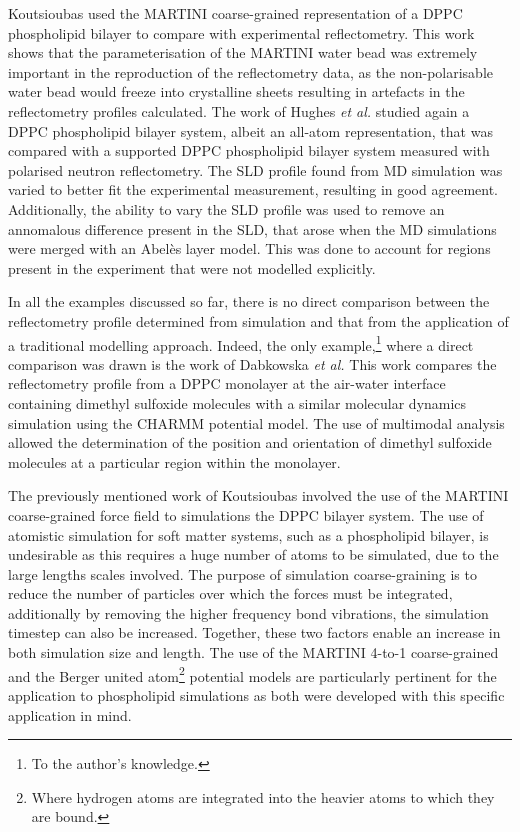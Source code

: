 Koutsioubas used the MARTINI coarse-grained representation of a DPPC phospholipid bilayer to compare with experimental reflectometry.\autocite{koutsioubas_combined_2016}
This work shows that the parameterisation of the MARTINI water bead was extremely important in the reproduction of the reflectometry data, as the non-polarisable water bead would freeze into crystalline sheets resulting in artefacts in the reflectometry profiles calculated.
The work of Hughes \emph{et al.} studied again a DPPC phospholipid bilayer system,\autocite{hughes_interpretation_2016} albeit an all-atom representation, that was compared with a supported DPPC phospholipid bilayer system measured with polarised neutron reflectometry.
The SLD profile found from MD simulation was varied to better fit the experimental measurement, resulting in good agreement.
Additionally, the ability to vary the SLD profile was used to remove an annomalous difference present in the SLD, that arose when the MD simulations were merged with an Abel\`{e}s layer model.
This was done to account for regions present in the experiment that were not modelled explicitly.

In all the examples discussed so far, there is no direct comparison between the reflectometry profile determined from simulation and that from the application of a traditional modelling approach.
Indeed, the only example,\footnote{To the author's knowledge.} where a direct comparison was drawn is the work of Dabkowska \emph{et al.}\autocite{dabkowska_modulation_2014}
This work compares the reflectometry profile from a DPPC monolayer at the air-water interface containing dimethyl sulfoxide molecules with a similar molecular dynamics simulation using the CHARMM potential model.
The use of multimodal analysis allowed the determination of the position and orientation of dimethyl sulfoxide molecules at a particular region within the monolayer.

The previously mentioned work of Koutsioubas involved the use of the MARTINI coarse-grained force field to simulations the DPPC bilayer system.\autocite{koutsioubas_combined_2016}
The use of atomistic simulation for soft matter systems, such as a phospholipid bilayer, is undesirable as this requires a huge number of atoms to be simulated, due to the large lengths scales involved.
The purpose of simulation coarse-graining is to reduce the number of particles over which the forces must be integrated, additionally by removing the higher frequency bond vibrations, the simulation timestep can also be increased.\autocite{pluhackova_biomembranes_2015}
Together, these two factors enable an increase in both simulation size and length.
The use of the MARTINI 4-to-1 coarse-grained and the Berger united atom\footnote{Where hydrogen atoms are integrated into the heavier atoms to which they are bound.} potential models are particularly pertinent for the application to phospholipid simulations as both were developed with this specific application in mind.\autocite{marrink_martini_2007,berger_molecular_1997}


